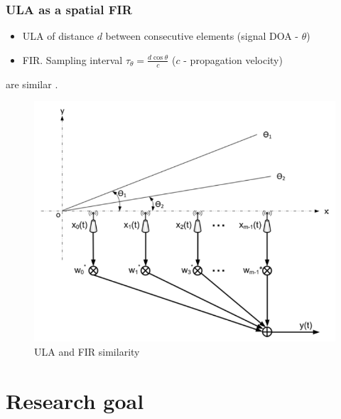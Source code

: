 \documentclass[10pt,pdflatex,headrule,landscape]{beamer}
\begin{document}
\begin{frame}
\frametitle{ULA as a spatial FIR}
\begin{minipage}{0.45\textwidth}
\begin{itemize}
\item{ULA of distance $ d $ between consecutive elements (signal DOA - $ \theta $)}
\item{FIR. Sampling interval $ \tau_{\theta}=\frac{d\cos{\theta}}{c} $ ($ c $ - propagation velocity)}
\end{itemize}
are similar \cite{van1988beamforming}.
\end{minipage}
\begin{minipage}{0.54\textwidth}
\begin{figure}
\includegraphics[width=\textwidth]{Media/ULA_FIR_similarity.PNG}
\caption{ULA and FIR similarity}
\end{figure}
\end{minipage}
\end{frame}

\section{Research goal}
\end{document}
